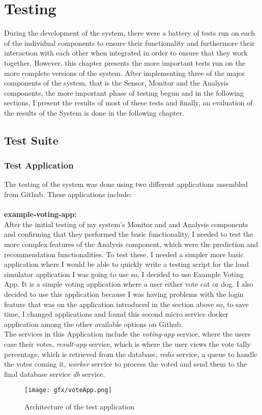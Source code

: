 \chapter{Testing}\label{ch:testing} %

During the development of the system, there were a battery of tests run on each of the individual components to ensure their functionality and furthermore their interaction with each other when integrated in order to ensure that they work together. However, this chapter presents the more important tests run on the more complete versions of the system. After implementing three of the major components of the system, that is the Sensor, Monitor and the Analysis components, the more important phase of testing begun and in the following sections, I present the results of most of these tests and finally, an evaluation of the results of the System is done in the following chapter.
\section{Test Suite}
\subsection{Test Application}
The testing of the system was done using two different applications assembled from Github. These applications include:\\\\
\textbf{example-voting-app:}\\
After the initial testing of my system's Monitor and and Analysis components and confirming that they performed the basic functionality, I needed to test the more complex features of the Analysis component, which were the prediction and recommendation functionalities. To test these, I needed a simpler more basic application where I would be able to quickly write a testing script for the load simulator application I was going to use so, I decided to use \cite{example-voting-app} Example Voting App. It is a simple voting application where a user either vote cat or dog. I also decided to use this application because I was having problems with the login feature that was on the application introduced in the section above so, to save time, I changed applications and found this second micro service docker application among the other available options on Github.\\
The services in this Application include the \textit{voting-app} service, where the users case their votes, \textit{result-app} service, which is where the user views the vote tally percentage, which is retrieved from the database, \textit{redis} service, a queue to handle the votes coming it, \textit{worker} service to process the voted and send them to the final database service \textit{db} service.
\begin{figure} [H]
   \centering 
   \texttt{[image: gfx/voteApp.png]}
   \caption{ Architecture of the test application} 
   \label{Fig:3} 
\end{figure}
